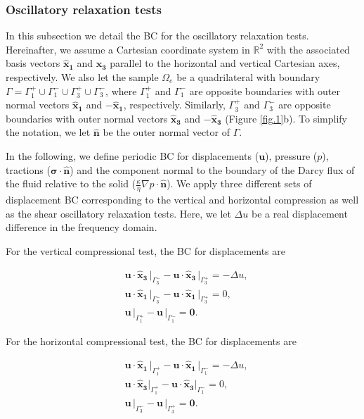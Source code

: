 \documentclass[draft]{agujournal2019}
\begin{document}
 
\subsubsection{Oscillatory relaxation tests}
In this subsection we detail the BC for the oscillatory relaxation tests. 
Hereinafter, we assume a Cartesian coordinate system in $\mathbb R^2$ with the associated basis vectors $\bm{\hat x_1}$ and $\bm{\hat x_3}$ parallel to the horizontal and vertical Cartesian axes, respectively. We also
let the sample $\Omega_e$ be a quadrilateral with boundary $\Gamma = \Gamma_1^+ \cup \Gamma_1^- \cup \Gamma_3^+ \cup \Gamma_3^- $, where $\Gamma_1^+ $ and $\Gamma_1^- $ are opposite boundaries with outer normal vectors $\bm{\hat x_1}$ and $ -\bm{\hat x_1}$, respectively. Similarly, $\Gamma_3^+ $ and $\Gamma_3^- $ are opposite boundaries with outer normal vectors $\bm{\hat x_3}$ and $ -\bm{\hat x_3}$ (Figure \ref{fig.1}b). To simplify the notation, we let $ \bm{\hat n}$ be the outer normal vector
of $\Gamma$.

In the following, we define periodic BC for displacements ($\bm{u}$), pressure ($p$), tractions ($\bm{\sigma}\cdot \bm{\hat n} $) and the component normal to the boundary of the Darcy flux of the fluid relative to the solid ($\frac{\kappa}{\eta} \nabla p \cdot \bm{\hat n}$). We apply three different sets of displacement BC corresponding to the vertical and horizontal compression as well as the shear oscillatory relaxation tests. Here, we let $\Delta u$ be a real displacement difference in the frequency domain.

For the vertical compressional test, the BC for displacements are
\begin{linenomath*}
\begin{equation}\label{Eq.8}
\begin{split}
&  \bm{u} \cdot \bm{\hat{x}_3} \, \vert_{\Gamma_3^-} - \bm{u}\cdot \bm{\hat{x}_3}\, \vert_{\Gamma_3^+} =- \Delta u, \\
&  \bm{u} \cdot \bm{\hat{x}_1}\, \vert_{\Gamma_3^-} - \bm{u} \cdot \bm{\hat{x}_1} \, \vert_{\Gamma_3^+} = 0, \\
& \bm{u}\,\vert_{\Gamma_1^+} - \bm{u}\,\vert_{\Gamma_1^-} = \bm{0}.
\end{split}
\end{equation}
\end{linenomath*}

For the horizontal compressional test, the BC for displacements are
\begin{linenomath*}
\begin{equation}\label{Eq.9}
\begin{split}
& \bm{u} \cdot \bm{\hat{x}_1}\, \vert_{\Gamma_1^+}-\bm{u} \cdot \bm{\hat{x}_1}\, \vert_{\Gamma_1^-} = - \Delta u, \\
& \bm{u} \cdot \bm{\hat{x}_3} \vert_{\Gamma_1^+}- \bm{u} \cdot \bm{\hat{x}_3}\vert_{\Gamma_1^-} =  0,  \\
& \bm{u}\,\vert_{\Gamma_3^-}- \bm{u}\,\vert_{\Gamma_3^+} = \bm{0}.
\end{split}
\end{equation}
\end{linenomath*}
\end{document}
